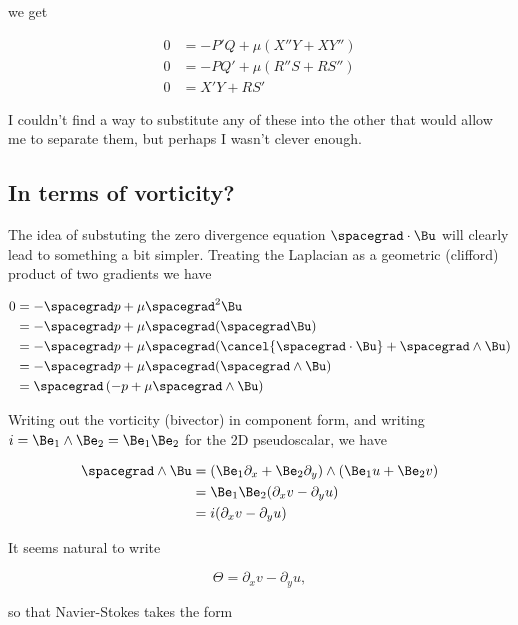 we get

\begin{align}\label{eqn:nsVorticity:70}
0 &= -P' Q + \mu (X'' Y + X Y'') \\
0 &= -P Q' + \mu (R'' S + R S'') \\
0 &= X' Y + R S'
\end{align}

I couldn't find a way to substitute any of these into the other that would allow me to separate them, but perhaps I wasn't clever enough.  

\subsection{In terms of vorticity?}

The idea of substuting the zero divergence equation $\spacegrad \cdot \Bu$ will clearly lead to something a bit simpler.  Treating the Laplacian as a geometric (clifford) product of two gradients we have

\begin{align*}
0 
&= -\spacegrad p + \mu \spacegrad^2 \Bu \\
&= -\spacegrad p + \mu \spacegrad ( \spacegrad \Bu ) \\
&= -\spacegrad p + \mu \spacegrad ( \cancel{\spacegrad \cdot \Bu} + \spacegrad \wedge \Bu ) \\
&= -\spacegrad p + \mu \spacegrad ( \spacegrad \wedge \Bu ) \\
&= \spacegrad \left( -p + \mu \spacegrad \wedge \Bu \right)
\end{align*}

Writing out the vorticity (bivector) in component form, and writing $i = \Be_1 \wedge \Be_2 = \Be_1 \Be_2$ for the 2D pseudoscalar, we have

\begin{align*}
\spacegrad \wedge \Bu 
&= (\Be_1 \partial_x + \Be_2 \partial_y) \wedge (\Be_1 u + \Be_2 v) \\
&= \Be_1 \Be_2 (\partial_x v - \partial_y u ) \\
&= i (\partial_x v - \partial_y u )
\end{align*}

It seems natural to write

\begin{equation}\label{eqn:qmTwoExamReflection:90}
\Theta = \partial_x v - \partial_y u,
\end{equation}

so that Navier-Stokes takes the form

